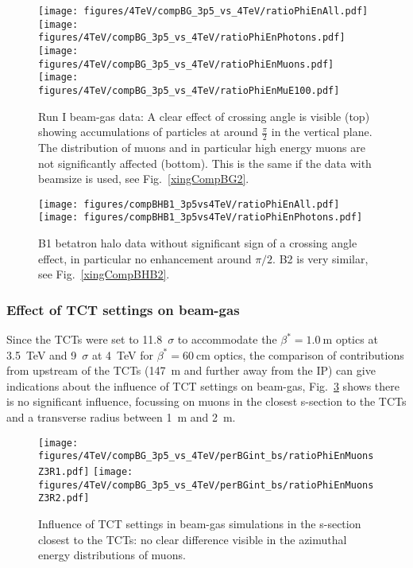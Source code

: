 \begin{figure}
\begin{center}
  \texttt{[image: figures/4TeV/compBG\_3p5\_vs\_4TeV/ratioPhiEnAll.pdf]}
  \texttt{[image: figures/4TeV/compBG\_3p5\_vs\_4TeV/ratioPhiEnPhotons.pdf]}
  \texttt{[image: figures/4TeV/compBG\_3p5\_vs\_4TeV/ratioPhiEnMuons.pdf]}
  \texttt{[image: figures/4TeV/compBG\_3p5\_vs\_4TeV/ratioPhiEnMuE100.pdf]}
\end{center}
\vspace{-0.6cm}
 \caption{Run I beam-gas data: A clear effect of crossing angle is visible (top) showing accumulations of particles at around $\frac{\pi}{2}$ in the vertical plane. The distribution of muons and in particular high energy muons are not significantly affected (bottom). This is the same if the data with beamsize is used, see Fig.~\ref{xingCompBG2}.
  \label{xingCompBG}}
\end{figure}


\begin{figure}
\centering
    \texttt{[image: figures/compBHB1\_3p5vs4TeV/ratioPhiEnAll.pdf]}
    \texttt{[image: figures/compBHB1\_3p5vs4TeV/ratioPhiEnPhotons.pdf]}
    \caption{B1 betatron halo data without significant sign of a crossing angle effect, in particular no enhancement around $\pi/2$. B2 is very similar, see Fig.~\ref{xingCompBHB2}.
      \label{xingCompBHB1}
      }
\end{figure}

\subsubsection{Effect of TCT settings on beam-gas}

Since the TCTs were set to 11.8~$\sigma$ to accommodate the $\beta^* = 1.0~$m optics at 3.5~TeV and 9~$\sigma$ at 4~TeV for $\beta^* = 60~$cm optics, the comparison of contributions from upstream of the TCTs (147~m and further away from the IP) can give indications about the influence of TCT settings on beam-gas, Fig.~\ref{compBGrun1} shows there is no significant influence, focussing on muons in the closest s-section to the TCTs and a transverse radius between 1~m and 2~m.

\begin{figure}
  \centering
  \texttt{[image: figures/4TeV/compBG\_3p5\_vs\_4TeV/perBGint\_bs/ratioPhiEnMuonsZ3R1.pdf]}
  \texttt{[image: figures/4TeV/compBG\_3p5\_vs\_4TeV/perBGint\_bs/ratioPhiEnMuonsZ3R2.pdf]}
  \caption{Influence of TCT settings in beam-gas simulations in the s-section closest to the TCTs: no clear difference visible in the azimuthal energy distributions of muons.
  \label{compBGrun1}}
\end{figure}

